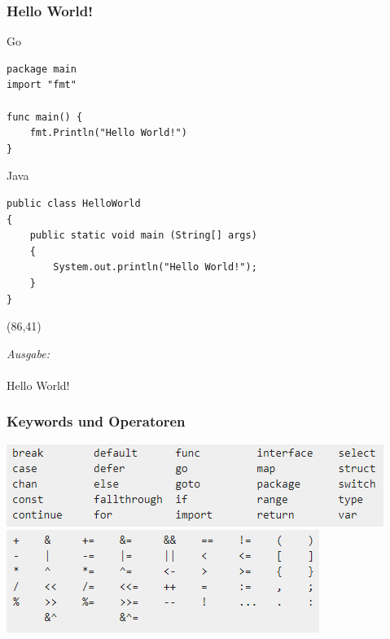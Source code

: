 \documentclass{beamer}
\begin{document}
\begin{frame}[fragile]
\frametitle{Hello World!}

Go
\begin{lstlisting}
package main
import "fmt"

func main() {
    fmt.Println("Hello World!")
}
\end{lstlisting}

Java
\lstset{language=Java}
\begin{lstlisting}
public class HelloWorld 
{ 
    public static void main (String[] args)
    {
        System.out.println("Hello World!");
    }
}
\end{lstlisting}

\begin{textblock}{32}(86,41)
\begin{tcolorbox}
\textit{Ausgabe:\\}\\
Hello World!
\end{tcolorbox}
\end{textblock}

\end{frame}


\begin{frame}[fragile]
\frametitle{Keywords und Operatoren}

\includegraphics[scale=0.9]{keywords.png}\\
\includegraphics[scale=0.9]{operators.png}

\end{frame}

\end{document}
